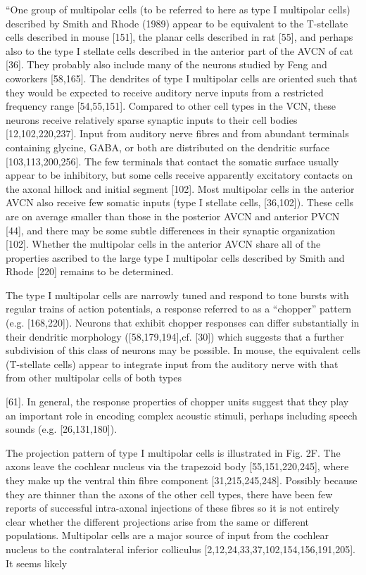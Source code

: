 \documentclass[10pt,a4paper]{article}
\begin{document}
{\textquotedblleft}One group of multipolar cells (to be referred to here as type
I multipolar cells) described by Smith and Rhode (1989) appear to be equivalent
to the T-stellate cells described in mouse [151], the planar cells described in
rat [55], and perhaps also to the type I stellate cells described in the
anterior part of the AVCN of cat [36].  They probably also include many of the
neurons studied by Feng and coworkers [58,165]. The dendrites of type I
multipolar cells are oriented such that they would be expected to receive
auditory nerve inputs from a restricted frequency range [54,55,151]. Compared to
other cell types in the VCN, these neurons receive relatively sparse synaptic
inputs to their cell bodies [12,102,220,237]. Input from auditory nerve fibres
and from abundant terminals containing glycine, GABA, or both are distributed on
the dendritic surface [103,113,200,256]. The few terminals that contact the
somatic surface usually appear to be inhibitory, but some cells receive
apparently excitatory contacts on the axonal hillock and initial segment
[102]. Most multipolar cells in the anterior AVCN also receive few somatic
inputs (type I stellate cells, [36,102]). These cells are on average smaller
than those in the posterior AVCN and anterior PVCN [44], and there may be some
subtle differences in their synaptic organization [102]. Whether the multipolar
cells in the anterior AVCN share all of the properties ascribed to the large
type I multipolar cells described by Smith and Rhode [220] remains to be
determined.

The type I multipolar cells are narrowly tuned and respond to tone bursts with
regular trains of action potentials, a response referred to as a
{\textquotedblleft}chopper{\textquotedblright} pattern (e.g.
[168,220]). Neurons that exhibit chopper responses can differ substantially in
their dendritic morphology ([58,179,194],cf. [30]) which suggests that a further
subdivision of this class of neurons may be possible. In mouse, the equivalent
cells (T-stellate cells) appear to integrate input from the auditory nerve with
that from other multipolar cells of both types

[61]. In general, the response properties of chopper units suggest that they
play an important role in encoding complex acoustic stimuli, perhaps including
speech sounds (e.g. [26,131,180]).

The projection pattern of type I multipolar cells is illustrated in Fig.
2F. The axons leave the cochlear nucleus via the trapezoid body
[55,151,220,245], where they make up the ventral thin fibre component
[31,215,245,248]. Possibly because they are thinner than the axons of the other
cell types, there have been few reports of successful intra-axonal injections of
these fibres so it is not entirely clear whether the different projections arise
from the same or different populations. Multipolar cells are a major source of
input from the cochlear nucleus to the contralateral inferior colliculus
[2,12,24,33,37,102,154,156,191,205]. It seems likely
\end{document}
